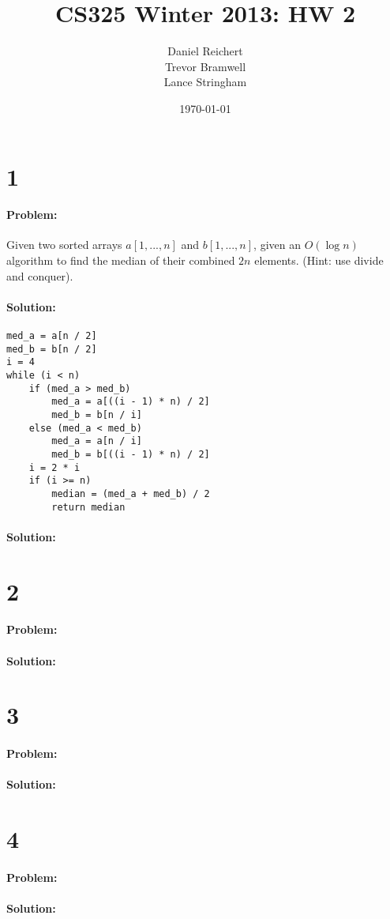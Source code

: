\documentclass[12pt]{article}
\title{CS325 Winter 2013: HW 2}
\author{
    Daniel Reichert \\
    Trevor Bramwell \\
    Lance Stringham
}
\date{\today}
\begin{document}
\maketitle

\section*{1}
\paragraph{Problem:}
Given two sorted arrays $a[1, ..., n]$ and $b[1, ..., n]$, given an $O(\log n)$
algorithm to find the median of their combined $2n$ elements. (Hint: use
divide and conquer).

\paragraph{Solution:}
\begin{verbatim}
med_a = a[n / 2]
med_b = b[n / 2]
i = 4
while (i < n)
    if (med_a > med_b)
        med_a = a[((i - 1) * n) / 2]
        med_b = b[n / i]
    else (med_a < med_b)
        med_a = a[n / i]
        med_b = b[((i - 1) * n) / 2]
    i = 2 * i
    if (i >= n)
        median = (med_a + med_b) / 2
        return median    
\end{verbatim}


\paragraph{Solution:}

\section*{2}
\paragraph{Problem:}
\paragraph{Solution:}

\section*{3}
\paragraph{Problem:}
\paragraph{Solution:}

\section*{4}
\paragraph{Problem:}
\paragraph{Solution:}
\end{document}
